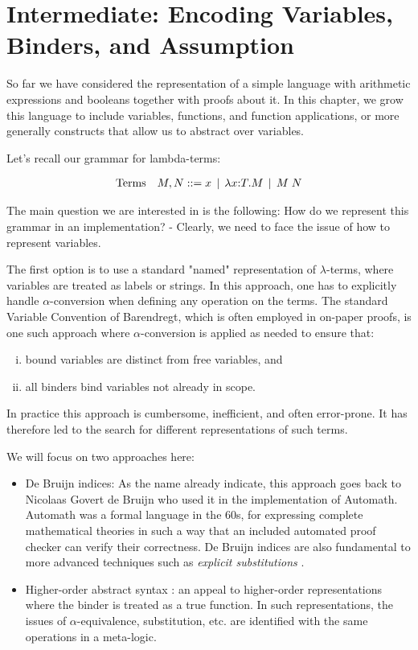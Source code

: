 \chapter{Intermediate: Encoding Variables, Binders, and Assumption}\label{chap:binders}
So far we have considered the representation of a simple language with
arithmetic expressions and booleans together with proofs about it. In this
chapter, we grow this language to include variables, functions, and function applications,
or more generally constructs that allow us to abstract over variables.

Let's recall our grammar for lambda-terms:

\[
\begin{array}{ll@{\bnfas}l}
\mbox{Terms} & M, N & x \bnfalt \lam x{:}T.M \bnfalt M \app N
\end{array}
\]

The main question we are interested in is the following: How do we
represent this grammar in an implementation? - Clearly, we need to
face the issue of how to represent variables.

The first option is to use a standard "named" representation of
$\lambda$-terms, where variables are treated as labels or strings. In
this approach, one has to explicitly handle $\alpha$-conversion when
defining any operation on the terms. The standard Variable Convention
of Barendregt, which is often employed in on-paper proofs, is one such
approach where $\alpha$-conversion is applied as needed to ensure
that:

\begin{enumerate}[(i)]
\item bound variables are distinct from free variables, and
\item all binders bind variables not already in scope.
\end{enumerate}

In practice this approach is cumbersome, inefficient, and often error-prone. It
has therefore led to the search for different representations of such terms.

We will focus on two approaches here:

\begin{itemize}
\item De Bruijn indices: As the name already indicate, this approach
  goes back to Nicolaas Govert de Bruijn who used it in the
  implementation of Automath. Automath was a formal language in the
  60s, for expressing complete mathematical theories in such a way
  that an included automated proof checker can verify their
  correctness. De Bruijn indices are also fundamental to more advanced
  techniques such as \emph{explicit substitutions}
  \cite{Abadi:POPL90}.

\item Higher-order abstract syntax \cite{Pfenning88pldi}: an appeal to
  higher-order representations where the binder is treated as a true
  function. In such representations, the issues of
  $\alpha$-equivalence, substitution, etc. are identified with the
  same operations in a meta-logic.
\end{itemize}

